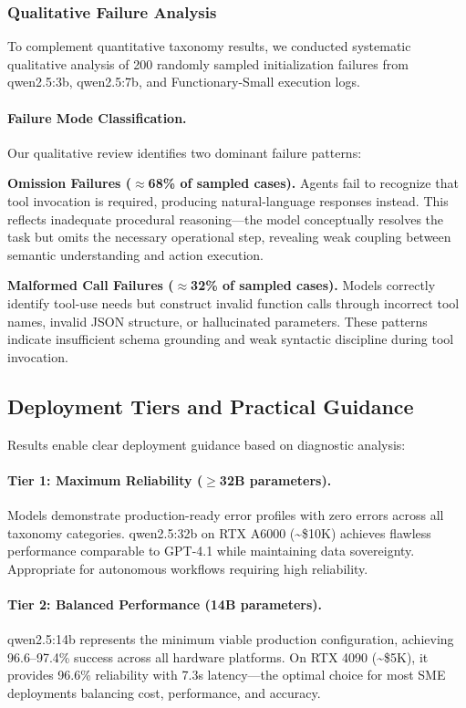 \subsubsection{Qualitative Failure Analysis}

To complement quantitative taxonomy results, we conducted systematic qualitative analysis of 200 randomly sampled initialization failures from qwen2.5:3b, qwen2.5:7b, and Functionary-Small execution logs.

\paragraph{Failure Mode Classification.} Our qualitative review identifies two dominant failure patterns:

\textbf{Omission Failures ($\approx$68\% of sampled cases).} Agents fail to recognize that tool invocation is required, producing natural-language responses instead. This reflects inadequate procedural reasoning---the model conceptually resolves the task but omits the necessary operational step, revealing weak coupling between semantic understanding and action execution.
    
\textbf{Malformed Call Failures ($\approx$32\% of sampled cases).} Models correctly identify tool-use needs but construct invalid function calls through incorrect tool names, invalid JSON structure, or hallucinated parameters. These patterns indicate insufficient schema grounding and weak syntactic discipline during tool invocation.

\subsection{Deployment Tiers and Practical Guidance}

Results enable clear deployment guidance based on diagnostic analysis:

\paragraph{Tier 1: Maximum Reliability ($\geq$32B parameters).} Models demonstrate production-ready error profiles with zero errors across all taxonomy categories. qwen2.5:32b on RTX A6000 (\textasciitilde\$10K) achieves flawless performance comparable to GPT-4.1 while maintaining data sovereignty. Appropriate for autonomous workflows requiring high reliability.

\paragraph{Tier 2: Balanced Performance (14B parameters).} qwen2.5:14b represents the minimum viable production configuration, achieving 96.6--97.4\% success across all hardware platforms. On RTX 4090 (\textasciitilde\$5K), it provides 96.6\% reliability with 7.3s latency---the optimal choice for most SME deployments balancing cost, performance, and accuracy.

